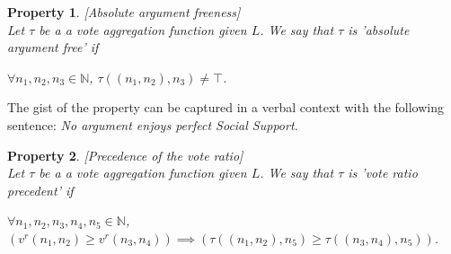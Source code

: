 \documentclass{article}
\newtheorem{property}{Property}
\newtheorem{proposition}{Proposition}
\newcommand{\nat}{\mathbb{N}}   %
\newcommand{\args}{\mathcal{A}} %
\newcommand{\valueset}{L}
\begin{document}
\begin{property}
\label{P1} [Absolute argument freeness] \\
Let $\tau$ be a a vote aggregation function given $\valueset$. We say that $\tau$ is 'absolute argument free' if
\begin{center}
$\forall n_1, n_2, n_3 \in \nat$, $\tau \left((n_1, n_2), n_3\right) \neq \top$. %
\end{center}
\end{property}

The gist of the property can be captured in a verbal context with the following sentence: \emph{No argument enjoys perfect Social Support.}  \\

\begin{comment}
\begin{proposition}
Enhanced Vote Aggregation function is absolute argument free.%
\end{proposition}


\begin{proof} Trivial.
\\
Suppose an arbitrary $a \in \args$ of an extended social argumentation framework $\mathcal{F}$ with some well-behaved semantics $\mathcal{S}$:\\
If $v^+ = 0$ then $\tau(a) = \tau(v^{+}, v^{-}, v_{max}) = 0 \le 1$. \\
Else if $v^+ \neq 0$, then $v_{max} \neq 0$ and since $v_{max} \in \mathcal{Z}^+$, then $\frac{1}{v_{max}} > 0.$ Since denominator equals to the addition of the numerator and some $r \in {R}^+ $, denominator is bigger than the numerator and thus \\
$ \frac{v^{+}}{v^{+}+v^{-}+\frac{1}{v_{max}}} = \tau(v^{+}, v^{-}, v_{max}) \le 1$.

\end{proof}
\end{comment}


\begin{property}
\label{P2}[Precedence of the vote ratio]\\
Let $\tau$ be a a vote aggregation function given $\valueset$. We say that $\tau$ is 'vote ratio precedent' if
\begin{center}
$\forall n_1, n_2, n_3, n_4, n_5 \in \nat$,  
$\left( v^{r}(n_{1}, n_{2}) \ge v^{r}(n_{3}, n_{4}) \right) \implies \left( \tau((n_{1}, n_{2}), n_{5}) \ge \tau((n_{3}, n_{4}), n_{5}) \right)$. \\

\begin{comment}
{\color{teal}
just for convenience:

 $\left( v^{r}(a_{1}) \ge v^{r}(a_{2}) \right) \implies \left( \tau(a_1) \ge \tau(a_2) \right)$. 
}
\end{comment}
\end{center}
\end{property}
\end{document}
